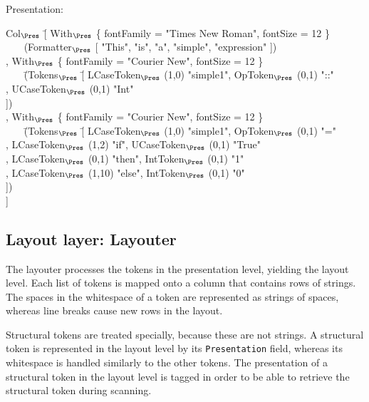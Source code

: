 Presentation:
\small \ttfamily
\begin{tabbing}
Col$_{\Pres}$ \= [ With$_{\Pres}$ \{ fontFamily = "Times New Roman", fontSize = 12 \}\\
       \>  ~~~ (Formatter$_{\Pres}$ [ "This", "is", "a", "simple", "expression" ])\\
       \>, With$_{\Pres}$ \{ fontFamily = "Courier New", fontSize = 12 \}\\
       \>  ~~~ \= (Tokens$_{\Pres}$ \= [ LCaseToken$_{\Pres}$ (1,0) "simple1",  OpToken$_{\Pres}$ (0,1) "::"\\  
       \>          \>              \> , UCaseToken$_{\Pres}$ (0,1) "Int"\\
       \>          \>              \> ])\\
       \>, With$_{\Pres}$ \{ fontFamily = "Courier New",  fontSize = 12 \}\\
       \>  ~~~ \= (Tokens$_{\Pres}$ \= [ LCaseToken$_{\Pres}$ (1,0) "simple1", OpToken$_{\Pres}$ (0,1) "="\\
       \>          \>              \> , LCaseToken$_{\Pres}$ (1,2) "if", UCaseToken$_{\Pres}$ (0,1) "True"\\
       \>          \>              \> , LCaseToken$_{\Pres}$ (0,1) "then", IntToken$_{\Pres}$ (0,1) "1"\\
       \>          \>              \> , LCaseToken$_{\Pres}$ (1,10) "else", IntToken$_{\Pres}$ (0,1) "0"\\
       \>          \>              \> ])\\
             \> ]
\end{tabbing}
\rmfamily \normalsize



%																
\subsection{Layout layer: Layouter} \label{sect:layouter}

The layouter processes the tokens in the presentation level, yielding the layout level. Each list of tokens is mapped onto a column that contains rows of strings. The spaces in the whitespace of a token are represented as strings of spaces, whereas line breaks cause new rows in the layout. 

Structural tokens are treated specially, because these are not strings. A structural token is represented in the layout level by its {\tt Presentation} field, whereas its whitespace is handled similarly to the other tokens. The presentation of a structural token in the layout level is tagged in order to be able to retrieve the structural token during scanning.

